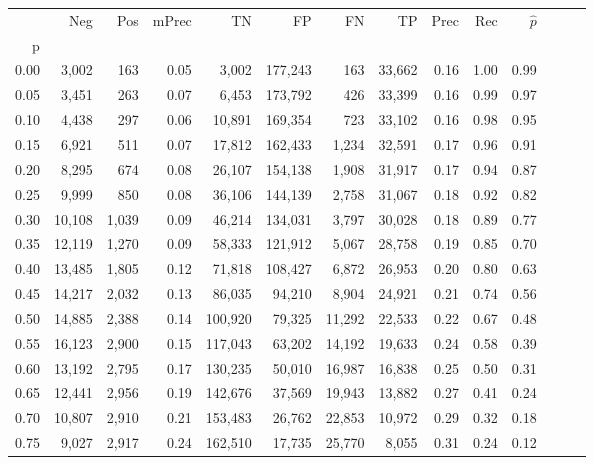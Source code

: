 \begin{tabular}{rrrrrrrrrrrrrr}
\toprule
{} &     Neg &    Pos & mPrec &       TN &       FP &      FN &      TP &  Prec &   Rec & $\hat{p}$ \\
p    &         &        &       &          &          &         &         &       &       &           \\
\midrule
0.00 &   3,002 &    163 &  0.05 &    3,002 &  177,243 &     163 &  33,662 &  0.16 &  1.00 &      0.99 \\
0.05 &   3,451 &    263 &  0.07 &    6,453 &  173,792 &     426 &  33,399 &  0.16 &  0.99 &      0.97 \\
0.10 &   4,438 &    297 &  0.06 &   10,891 &  169,354 &     723 &  33,102 &  0.16 &  0.98 &      0.95 \\
0.15 &   6,921 &    511 &  0.07 &   17,812 &  162,433 &   1,234 &  32,591 &  0.17 &  0.96 &      0.91 \\
0.20 &   8,295 &    674 &  0.08 &   26,107 &  154,138 &   1,908 &  31,917 &  0.17 &  0.94 &      0.87 \\
0.25 &   9,999 &    850 &  0.08 &   36,106 &  144,139 &   2,758 &  31,067 &  0.18 &  0.92 &      0.82 \\
0.30 &  10,108 &  1,039 &  0.09 &   46,214 &  134,031 &   3,797 &  30,028 &  0.18 &  0.89 &      0.77 \\
0.35 &  12,119 &  1,270 &  0.09 &   58,333 &  121,912 &   5,067 &  28,758 &  0.19 &  0.85 &      0.70 \\
0.40 &  13,485 &  1,805 &  0.12 &   71,818 &  108,427 &   6,872 &  26,953 &  0.20 &  0.80 &      0.63 \\
0.45 &  14,217 &  2,032 &  0.13 &   86,035 &   94,210 &   8,904 &  24,921 &  0.21 &  0.74 &      0.56 \\
0.50 &  14,885 &  2,388 &  0.14 &  100,920 &   79,325 &  11,292 &  22,533 &  0.22 &  0.67 &      0.48 \\
0.55 &  16,123 &  2,900 &  0.15 &  117,043 &   63,202 &  14,192 &  19,633 &  0.24 &  0.58 &      0.39 \\
0.60 &  13,192 &  2,795 &  0.17 &  130,235 &   50,010 &  16,987 &  16,838 &  0.25 &  0.50 &      0.31 \\
0.65 &  12,441 &  2,956 &  0.19 &  142,676 &   37,569 &  19,943 &  13,882 &  0.27 &  0.41 &      0.24 \\
0.70 &  10,807 &  2,910 &  0.21 &  153,483 &   26,762 &  22,853 &  10,972 &  0.29 &  0.32 &      0.18 \\
0.75 &   9,027 &  2,917 &  0.24 &  162,510 &   17,735 &  25,770 &   8,055 &  0.31 &  0.24 &      0.12 \\

\end{tabular}
